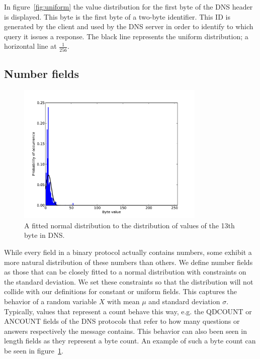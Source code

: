 \documentclass[a4paper]{report}
\begin{document}
In figure~\ref{fig:uniform} the value distribution for the first byte of the
DNS header is displayed. This byte is the first byte of a two-byte identifier.
This ID is generated by the client and used by the DNS server in order to
identify to which query it issues a response. The black line represents the
uniform distribution; a horizontal line at $\frac{1}{256}$.

\newpage

\subsection{Number fields}

\begin{figure}[h]
    \centering
    \includegraphics[width=0.8\textwidth]{number}
    \captionsetup{width=0.8\textwidth}
    \caption{A fitted normal distribution to the distribution of values of the
    13th byte in DNS.}
    \label{fig:number}
\end{figure}

While every field in a binary protocol actually contains numbers, some exhibit
a more natural distribution of these numbers than others. We define number
fields as those that can be closely fitted to a normal distribution with
constraints on the standard deviation. We set these constraints so that the
distribution will not collide with our definitions for constant or uniform
fields. This captures the behavior of a random variable $X$ with mean $\mu$ and
standard deviation $\sigma$. Typically, values that represent a count behave
this way, e.g. the QDCOUNT or ANCOUNT fields of the DNS protocols that refer to
how many questions or answers respectively the message contains. This behavior
can also been seen in length fields as they represent a byte count. An example
of such a byte count can be seen in figure~\ref{fig:number}.
\end{document}
